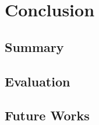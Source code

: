 \chapter{Conclusion}
\label{chap:conclusion}

\section{Summary}
\label{sec:summary}

\section{Evaluation}
\label{sec:eval-total}

\section{Future Works}
\label{sec:futureWorks}
